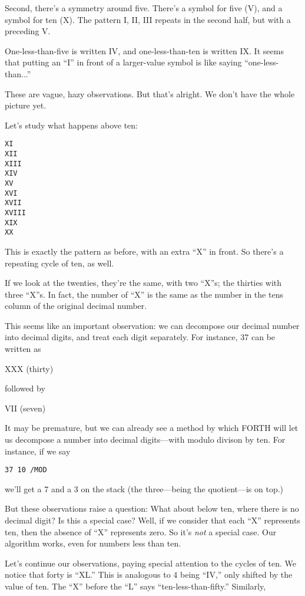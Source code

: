 Second, there's a symmetry around five. There's a symbol for five
(V), and a symbol for ten (X). The pattern I, II, III repeats in the second
half, but with a preceding V.

One-less-than-five is written IV, and one-less-than-ten is written IX.
It seems that putting an ``I'' in front of a larger-value symbol is like
saying ``one-less-than...''

These are vague, hazy observations. But that's alright. We don't
have the whole picture yet.

Let's study what happens above ten:

\begin{verbatim}
XI
XII
XIII
XIV
XV
XVI
XVII
XVIII
XIX
XX
\end{verbatim}

This is exactly the pattern as before, with an extra ``X'' in front. So
there's a repeating cycle of ten, as well.

If we look at the twenties, they're the same, with two ``X''s; the
thirties with three ``X''s. In fact, the number of ``X'' is the same as the
number in the tens column of the original decimal number.

This seems like an important observation: we can decompose our decimal
number into decimal digits, and treat each digit separately. For instance,
37 can be written as

XXX (thirty)

followed by

VII (seven)

It may be premature, but we can already see a method by which FORTH
will let us decompose a number into decimal digits---with modulo divison
by ten. For instance, if we say

\begin{verbatim}
37 10 /MOD
\end{verbatim}

we'll get a 7 and a 3 on the stack (the three---being the quotient---is on
top.)

But these observations raise a question: What about below ten,
where there is no decimal digit? Is this a special case? Well, if we consider
that each ``X'' represents ten, then the absence of ``X'' represents zero.
So it's \emph{not} a special case. Our algorithm works, even for numbers less
than ten.

Let's continue our observations, paying special attention to the
cycles of ten. We notice that forty is ``XL.'' This is analogous to 4 being
``IV,'' only shifted by the value of ten. The ``X'' before the ``L'' says
``ten-less-than-fifty.'' Similarly,

